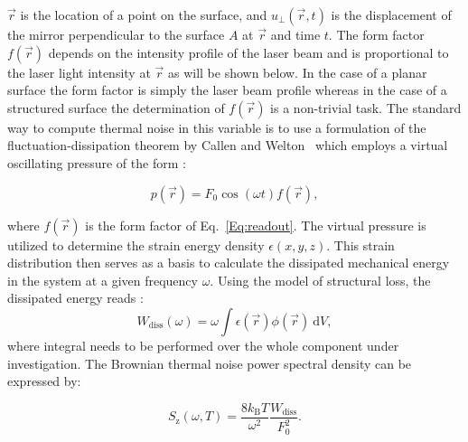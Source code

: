 \documentclass[twocolumn,secnumarabic,amssymb, nobibnotes, aps, prd, showpacs]{revtex4-1}
\begin{document}
\noindent$\vec{r}$ is the location of a point on the surface, and $u_\perp(\vec{r},t)$ is the displacement of the mirror perpendicular to the surface $A$ at $\vec{r}$ and time $t$. The form factor $f(\vec{r})$ depends on the intensity profile of the laser beam and is proportional to the laser light intensity at $\vec{r}$ as will be shown below. 
In the case of a planar surface the form factor is simply the laser beam profile whereas in the case of a structured surface the determination of $f(\vec{r})$ is a non-trivial task. The standard way to compute thermal noise in this variable is to use a formulation of the fluctuation-dissipation theorem by Callen and Welton~\cite{Cal1951} which employs a virtual oscillating pressure of the form \cite{Lev1998}:

\begin{equation}
p(\vec{r})=F_0\cos(\omega t)f(\vec{r}),
\label{Eq:pressure}
\end{equation}

\noindent where $f(\vec{r})$ is the form factor of Eq.~\ref{Eq:readout}. The virtual pressure is utilized to determine the strain energy density $\epsilon(x,y,z)$. This strain distribution then serves as a basis to calculate the dissipated mechanical energy in the system at a given frequency $\omega$. Using the model of structural loss, the dissipated energy reads \cite{Lev1998}:
\begin{equation}
W_\mathrm{diss}(\omega)=\omega \int{\epsilon(\vec{r})\phi(\vec{r})\ \mathrm{d}V},
\label{Eq:Wdiss}
\end{equation}
\noindent where integral needs to be performed over the whole component under investigation.
The Brownian thermal noise power spectral density can be expressed by:

\begin{equation}
S_\mathrm{z}(\omega, T)=\frac{8k_\mathrm{B}T}{\omega^2}\frac{W_\mathrm{diss}}{F_0^2}.
\label{Eq:noise}
\end{equation}
\end{document}
